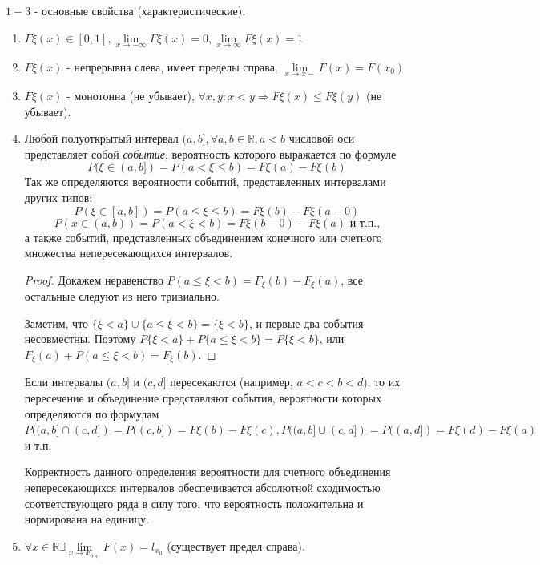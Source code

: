 \noindent $1-3$ - основные свойства (характеристические).

\begin{enumerate}
	\item $F\xi (x) \in [0, 1], \lim\limits_{x \to - \infty} F\xi (x) = 0, \lim\limits_{x \to \infty} F\xi (x) = 1$
	\item $F\xi (x)$ - непрерывна слева, имеет пределы справа, $\lim\limits_{x \to x-} F(x) = F(x_0)$
	\item $F\xi (x)$ - монотонна (не убывает), $\forall x, y : x < y \Rightarrow F\xi (x) \le F\xi (y)$ (не убывает).
	\item Любой полуоткрытый интервал $(a, b], \forall a, b \in \mathbb{R}, a < b$ числовой оси представляет собой \textit{событие}, вероятность которого выражается по формуле
	\[ P(\xi \in (a, b]) = P(a < \xi \le b) = F\xi (a) - F\xi (b) \]
	Так же определяются вероятности событий, представленных интервалами других типов:
	\[ P(\xi \in [a, b]) = P(a \le \xi \le b) = F\xi (b) - F\xi (a - 0) \]
	\[ P(x \in (a, b)) = P(a < \xi < b) = F\xi (b - 0) - F\xi (a) \text{ и т.п.,} \]
	а также событий, представленных объединением конечного или счетного множества непересекающихся интервалов.
	
	\begin{proof}
		Докажем неравенство $P(a \le \xi < b) = F_{\xi} (b) - F_{\xi}(a)$, все остальные следуют из него тривиально.
		
		Заметим, что $\{ \xi < a \} \cup \{ a \le \xi < b \} = \{ \xi < b \}$, и первые два события несовместны. Поэтому $P \{ \xi < a \} + P \{ a \le \xi < b \} = P \{ \xi < b \}$, или $F_{\xi} (a) + P(a \le \xi < b) = F_{\xi}(b)$.
	\end{proof}
	
	Если интервалы $(a, b]$ и $(c, d]$ пересекаются (например, $a < c < b < d$), то их пересечение и объединение представляют события, вероятности которых определяются по формулам $P((a, b] \cap (c, d]) = P((c, b]) = F\xi (b) - F\xi (c), P((a, b] \cup (c, d]) = P((a, d]) = F\xi (d) - F\xi (a)$ и т.п.
	
	Корректность данного определения вероятности для счетного объединения непересекающихся
	интервалов обеспечивается абсолютной сходимостью соответствующего ряда в силу того, что вероятность положительна и нормирована на единицу.
	\item $\forall x \in \mathbb{R} \exists \lim\limits_{x \to x_{0+}} F(x) = l_{x_0}$ (существует предел справа).
\end{enumerate}

